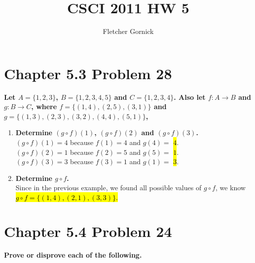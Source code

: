\documentclass[10pt]{article}
\title{CSCI 2011 HW 5}
\author{Fletcher Gornick}
\begin{document}
\maketitle

\section{Chapter 5.3 Problem 28}
\textbf{Let $A = \{1,2,3\}$, $B = \{1,2,3,4,5\}$ and $C = \{1,2,3,4\}$.  Also let $f: A \to B$ and $g: B \to C$,
where $f = \{(1,4), (2,5), (3,1)\}$ and $g = \{(1,3), (2,3), (3,2), (4,4), (5,1)\}$,}

\begin{enumerate}[label=(\alph*)]

    \item \textbf{Determine $(g \circ f)(1)$, $(g \circ f)(2)$ and $(g \circ f)(3)$.} \\
        $(g \circ f)(1) = 4$ because $f(1) = 4$ and $g(4) =$ \hl{$4$}. \\
        $(g \circ f)(2) = 1$ because $f(2) = 5$ and $g(5) =$ \hl{$1$}. \\
        $(g \circ f)(3) = 3$ because $f(3) = 1$ and $g(1) =$ \hl{$3$}. 

    \item \textbf{Determine $g \circ f$.} \\
        Since in the previous example, we found all possible values of $g \circ f$, we know \hl{$g \circ f = \{(1,4), (2,1), (3,3)\}$.}

\end{enumerate}



\section{Chapter 5.4 Problem 24}
\textbf{Prove or disprove each of the following.}
\end{document}
